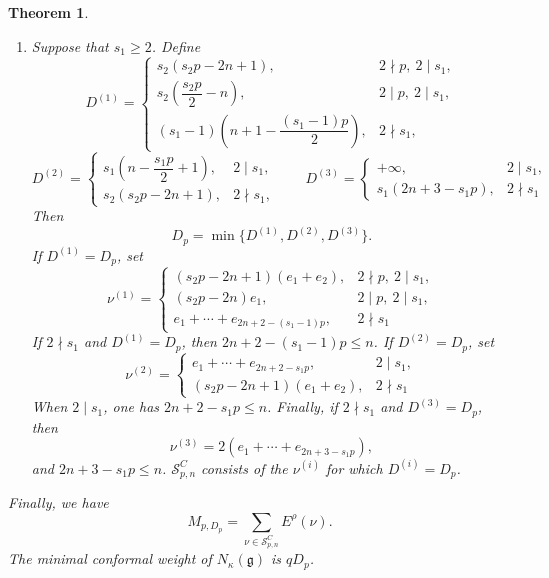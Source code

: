\documentclass[11pt,a4paper]{amsart}
\theoremstyle{plain}
\newtheorem{theorem}{Theorem}[section]
\numberwithin{equation}{section}
\begin{document}
\begin{theorem}
\begin{enumerate}
If  $p=n+2$, then
$
D_p=\min\{p+1,10\},
$
where 
\(\nu=4e_1+2(e_2+\cdots+e_n)\) when \(D_p=p+1\), and
\(\nu=5(e_1+e_2)\) when \(D_p=10\).
\item Suppose that \(s_1\ge2\). Define
\[
D^{(1)}=\begin{cases}
s_2(s_2p-2n+1),&2\nmid p,\ 2\mid s_1,\\
s_2\left(\dfrac{s_2p}{2}-n\right),&2\mid p,\ 2\mid s_1,\\
(s_1-1)\left(n+1-\dfrac{(s_1-1)p}{2}\right),&2\nmid s_1,
\end{cases}
\]
\[
D^{(2)}=\begin{cases}
s_1\left(n-\dfrac{s_1p}{2}+1\right),&2\mid s_1,\\
s_2(s_2p-2n+1),&2\nmid s_1,
\end{cases}
\qquad
D^{(3)}=\begin{cases}+\infty,&2\mid s_1,\\
s_1(2n+3-s_1p),&2\nmid s_1
\end{cases}
\]
Then
\[
D_p=\min\{D^{(1)},D^{(2)},D^{(3)}\}.
\]
If \(D^{(1)}=D_p\), set
\[
\nu^{(1)}=\begin{cases}
(s_2p-2n+1)(e_1+e_2),&2\nmid p,\ 2\mid s_1,\\
(s_2p-2n)e_1,&2\mid p,\ 2\mid s_1,\\
e_1+\cdots+e_{2n+2-(s_1-1)p},&2\nmid s_1
\end{cases}
\]
If \(2\nmid s_1\) and \(D^{(1)}=D_p\), then
\(2n+2-(s_1-1)p\le n\). If \(D^{(2)}=D_p\), set
\[
\nu^{(2)}=\begin{cases}
e_1+\cdots+e_{2n+2-s_1p},&2\mid s_1,\\
(s_2p-2n+1)(e_1+e_2),&2\nmid s_1
\end{cases}
\]
When $2\mid s_1$, one has $2n+2-s_1p\le n$. Finally, if
$2\nmid s_1$ and $D^{(3)}=D_p$, then
\[
\nu^{(3)}=2(e_1+\cdots+e_{2n+3-s_1p}),
\]
and $2n+3-s_1p\le n$. \(\mathcal S^C_{p,n}\) consists of the
\(\nu^{(i)}\) for which \(D^{(i)}=D_p\).
\end{enumerate}
Finally, we have
\begin{equation}\label{eq:C-first-coefficient}
M_{p,D_p}
=\sum_{\nu\in\mathcal S^C_{p,n}}E^\rho(\nu).
\end{equation}
The minimal conformal weight of \(N_\kappa(\mathfrak g)\) is
\(qD_p\).
\end{theorem}
\end{document}
